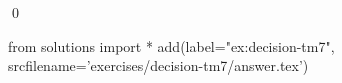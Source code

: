 
\begin{ex} 
  \label{ex:decision-tm7}
  
  \qed
\end{ex} 
\begin{python0}
from solutions import *
add(label="ex:decision-tm7",
    srcfilename='exercises/decision-tm7/answer.tex') 
\end{python0}
